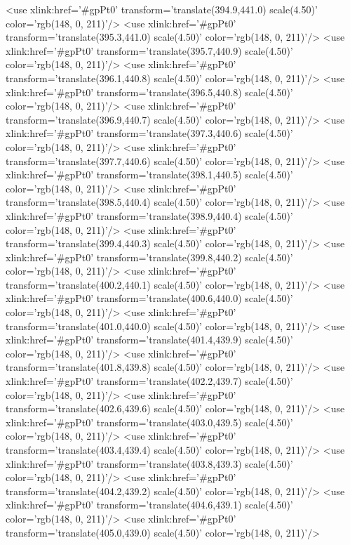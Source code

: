 	<use xlink:href='#gpPt0' transform='translate(394.9,441.0) scale(4.50)' color='rgb(148,   0, 211)'/>
	<use xlink:href='#gpPt0' transform='translate(395.3,441.0) scale(4.50)' color='rgb(148,   0, 211)'/>
	<use xlink:href='#gpPt0' transform='translate(395.7,440.9) scale(4.50)' color='rgb(148,   0, 211)'/>
	<use xlink:href='#gpPt0' transform='translate(396.1,440.8) scale(4.50)' color='rgb(148,   0, 211)'/>
	<use xlink:href='#gpPt0' transform='translate(396.5,440.8) scale(4.50)' color='rgb(148,   0, 211)'/>
	<use xlink:href='#gpPt0' transform='translate(396.9,440.7) scale(4.50)' color='rgb(148,   0, 211)'/>
	<use xlink:href='#gpPt0' transform='translate(397.3,440.6) scale(4.50)' color='rgb(148,   0, 211)'/>
	<use xlink:href='#gpPt0' transform='translate(397.7,440.6) scale(4.50)' color='rgb(148,   0, 211)'/>
	<use xlink:href='#gpPt0' transform='translate(398.1,440.5) scale(4.50)' color='rgb(148,   0, 211)'/>
	<use xlink:href='#gpPt0' transform='translate(398.5,440.4) scale(4.50)' color='rgb(148,   0, 211)'/>
	<use xlink:href='#gpPt0' transform='translate(398.9,440.4) scale(4.50)' color='rgb(148,   0, 211)'/>
	<use xlink:href='#gpPt0' transform='translate(399.4,440.3) scale(4.50)' color='rgb(148,   0, 211)'/>
	<use xlink:href='#gpPt0' transform='translate(399.8,440.2) scale(4.50)' color='rgb(148,   0, 211)'/>
	<use xlink:href='#gpPt0' transform='translate(400.2,440.1) scale(4.50)' color='rgb(148,   0, 211)'/>
	<use xlink:href='#gpPt0' transform='translate(400.6,440.0) scale(4.50)' color='rgb(148,   0, 211)'/>
	<use xlink:href='#gpPt0' transform='translate(401.0,440.0) scale(4.50)' color='rgb(148,   0, 211)'/>
	<use xlink:href='#gpPt0' transform='translate(401.4,439.9) scale(4.50)' color='rgb(148,   0, 211)'/>
	<use xlink:href='#gpPt0' transform='translate(401.8,439.8) scale(4.50)' color='rgb(148,   0, 211)'/>
	<use xlink:href='#gpPt0' transform='translate(402.2,439.7) scale(4.50)' color='rgb(148,   0, 211)'/>
	<use xlink:href='#gpPt0' transform='translate(402.6,439.6) scale(4.50)' color='rgb(148,   0, 211)'/>
	<use xlink:href='#gpPt0' transform='translate(403.0,439.5) scale(4.50)' color='rgb(148,   0, 211)'/>
	<use xlink:href='#gpPt0' transform='translate(403.4,439.4) scale(4.50)' color='rgb(148,   0, 211)'/>
	<use xlink:href='#gpPt0' transform='translate(403.8,439.3) scale(4.50)' color='rgb(148,   0, 211)'/>
	<use xlink:href='#gpPt0' transform='translate(404.2,439.2) scale(4.50)' color='rgb(148,   0, 211)'/>
	<use xlink:href='#gpPt0' transform='translate(404.6,439.1) scale(4.50)' color='rgb(148,   0, 211)'/>
	<use xlink:href='#gpPt0' transform='translate(405.0,439.0) scale(4.50)' color='rgb(148,   0, 211)'/>
